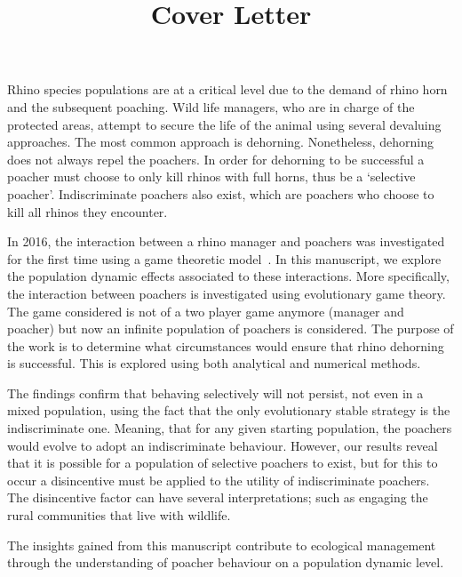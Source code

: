 \documentclass[10pt]{article}
\title{Cover Letter}
\date{}
\begin{document}
\maketitle

Rhino species populations are at a critical level due to the demand of rhino horn
and the subsequent poaching. Wild life managers, who are in charge of the protected
areas, attempt to secure the life of the animal using several devaluing approaches.
The most common approach is dehorning. Nonetheless, dehorning does not always repel
the poachers. In order for dehorning to be successful a poacher must choose to only
kill rhinos with full horns, thus be a `selective poacher'. Indiscriminate poachers
also exist, which are poachers who choose to kill all rhinos they encounter.

In 2016, the interaction between a rhino manager and poachers was investigated for
the first time using a game theoretic model~\cite{Lee}. 
In this manuscript, we explore the population dynamic effects associated to these
interactions. More specifically, the interaction between poachers is investigated
using evolutionary game theory. The game considered is not of a two player game
anymore (manager and poacher) but now an infinite population of poachers is considered. 
The purpose of the work is to determine what circumstances would ensure that rhino
dehorning is successful. This is explored using both analytical and numerical methods.

The findings confirm that behaving selectively will not persist, not even in a
mixed population, using the fact that the only evolutionary stable strategy is the
indiscriminate one. Meaning, that for any given starting population, the poachers
would evolve to adopt an indiscriminate behaviour. However, our results reveal
that it is possible for a population of selective poachers to exist, but for this
to occur a disincentive must be applied to the utility of indiscriminate poachers.
The disincentive factor can have several interpretations; such as engaging the
rural communities that live with wildlife.

The insights gained from this manuscript contribute to ecological management through
the understanding of poacher behaviour on a population dynamic level.



\end{document}
